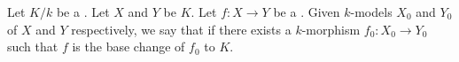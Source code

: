 \begin{definition} \label{definition:defined_over_a_field_for_a_morphism_of_schemes_over_an_extension}
    Let $K/k$ be a . Let $X$ and $Y$ be  $K$. Let $f: X \to Y$ be a .
    Given $k$-models $X_0$ and $Y_0$ of $X$ and $Y$ respectively, we say that  if there exists a $k$-morphism $f_0: X_0 \to Y_0$ such that $f$ is the base change of $f_0$ to $K$. 
\end{definition}